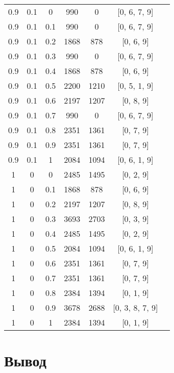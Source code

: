\begin{table}[H]
\begin{center}
\begin{tabular}{|c@{\hspace{7mm}}|c@{\hspace{7mm}}|c@{\hspace{7mm}}|c@{\hspace{7mm}}|c@{\hspace{7mm}}|c@{\hspace{7mm}}|c|}
0.9  & 0.1  & 0    & 990   & 0     & [0, 6, 7, 9]\\
0.9  & 0.1  & 0.1  & 990   & 0     & [0, 6, 7, 9]\\
0.9  & 0.1  & 0.2  & 1868  & 878   & [0, 6, 9]\\
0.9  & 0.1  & 0.3  & 990   & 0     & [0, 6, 7, 9]\\
0.9  & 0.1  & 0.4  & 1868  & 878   & [0, 6, 9]\\
0.9  & 0.1  & 0.5  & 2200  & 1210  & [0, 5, 1, 9]\\
0.9  & 0.1  & 0.6  & 2197  & 1207  & [0, 8, 9]\\
0.9  & 0.1  & 0.7  & 990   & 0     & [0, 6, 7, 9]\\
0.9  & 0.1  & 0.8  & 2351  & 1361  & [0, 7, 9]\\
0.9  & 0.1  & 0.9  & 2351  & 1361  & [0, 7, 9]\\
0.9  & 0.1  & 1    & 2084  & 1094  & [0, 6, 1, 9]\\
1    & 0    & 0    & 2485  & 1495  & [0, 2, 9]\\
1    & 0    & 0.1  & 1868  & 878   & [0, 6, 9]\\
1    & 0    & 0.2  & 2197  & 1207  & [0, 8, 9]\\
1    & 0    & 0.3  & 3693  & 2703  & [0, 3, 9]\\
1    & 0    & 0.4  & 2485  & 1495  & [0, 2, 9]\\
1    & 0    & 0.5  & 2084  & 1094  & [0, 6, 1, 9]\\
1    & 0    & 0.6  & 2351  & 1361  & [0, 7, 9]\\
1    & 0    & 0.7  & 2351  & 1361  & [0, 7, 9]\\
1    & 0    & 0.8  & 2384  & 1394  & [0, 1, 9]\\
1    & 0    & 0.9  & 3678  & 2688  & [0, 3, 8, 7, 9]\\
1    & 0    & 1    & 2384  & 1394  & [0, 1, 9]\\
\hline

	\end{tabular}

\end{center}

\end{table}

\section*{Вывод}

